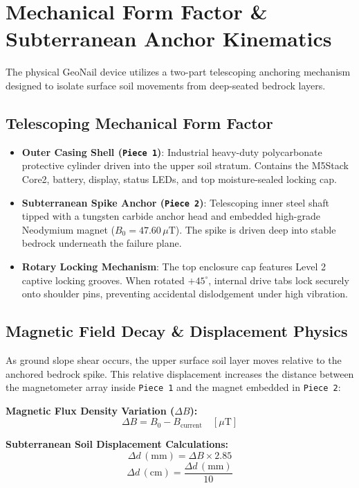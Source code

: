 \documentclass[11pt,a4paper]{article}
\begin{document}
\section{Mechanical Form Factor \& Subterranean Anchor Kinematics}

The physical GeoNail device utilizes a two-part telescoping anchoring mechanism designed to isolate surface soil movements from deep-seated bedrock layers.

\subsection{Telescoping Mechanical Form Factor}
\begin{itemize}[leftmargin=*]
    \item \textbf{Outer Casing Shell (\texttt{Piece 1})}: Industrial heavy-duty polycarbonate protective cylinder driven into the upper soil stratum. Contains the M5Stack Core2, battery, display, status LEDs, and top moisture-sealed locking cap.
    \item \textbf{Subterranean Spike Anchor (\texttt{Piece 2})}: Telescoping inner steel shaft tipped with a tungsten carbide anchor head and embedded high-grade Neodymium magnet ($B_0 = 47.60\,\mu\text{T}$). The spike is driven deep into stable bedrock underneath the failure plane.
    \item \textbf{Rotary Locking Mechanism}: The top enclosure cap features Level 2 captive locking grooves. When rotated $+45^\circ$, internal drive tabs lock securely onto shoulder pins, preventing accidental dislodgement under high vibration.
\end{itemize}

\subsection{Magnetic Field Decay \& Displacement Physics}
As ground slope shear occurs, the upper surface soil layer moves relative to the anchored bedrock spike. This relative displacement increases the distance between the magnetometer array inside \texttt{Piece 1} and the magnet embedded in \texttt{Piece 2}:

\begin{mathbox}
\textbf{Magnetic Flux Density Variation ($\Delta B$):}
\begin{equation}
\Delta B = B_0 - B_{\text{current}} \quad [\mu\text{T}]
\end{equation}

\textbf{Subterranean Soil Displacement Calculations:}
\begin{equation}
\Delta d \,(\text{mm}) = \Delta B \times 2.85
\end{equation}
\begin{equation}
\Delta d \,(\text{cm}) = \frac{\Delta d \,(\text{mm})}{10}
\end{equation}
\end{mathbox}
\end{document}
